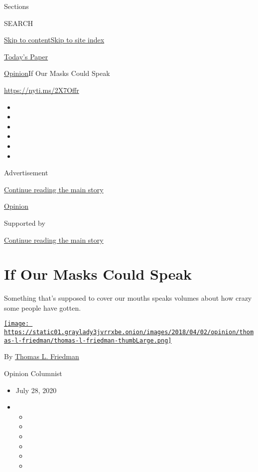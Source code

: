 Sections

SEARCH

\protect\hyperlink{site-content}{Skip to
content}\protect\hyperlink{site-index}{Skip to site index}

\href{https://myaccount.nytimes3xbfgragh.onion/auth/login?response_type=cookie\&client_id=vi}{}

\href{https://www.nytimes3xbfgragh.onion/section/todayspaper}{Today's
Paper}

\href{/section/opinion}{Opinion}\textbar{}If Our Masks Could Speak

\url{https://nyti.ms/2X7Offr}

\begin{itemize}
\item
\item
\item
\item
\item
\item
\end{itemize}

Advertisement

\protect\hyperlink{after-top}{Continue reading the main story}

\href{/section/opinion}{Opinion}

Supported by

\protect\hyperlink{after-sponsor}{Continue reading the main story}

\hypertarget{if-our-masks-could-speak}{%
\section{If Our Masks Could Speak}\label{if-our-masks-could-speak}}

Something that's supposed to cover our mouths speaks volumes about how
crazy some people have gotten.

\href{https://www.nytimes3xbfgragh.onion/by/thomas-l-friedman}{\texttt{[image: https://static01.graylady3jvrrxbe.onion/images/2018/04/02/opinion/thomas-l-friedman/thomas-l-friedman-thumbLarge.png]}}

By \href{https://www.nytimes3xbfgragh.onion/by/thomas-l-friedman}{Thomas
L. Friedman}

Opinion Columnist

\begin{itemize}
\item
  July 28, 2020
\item
  \begin{itemize}
  \item
  \item
  \item
  \item
  \item
  \item
  \end{itemize}
\end{itemize}

